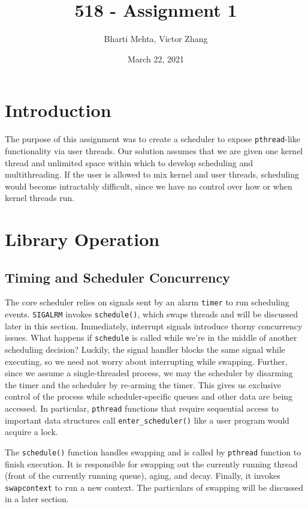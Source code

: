 \documentclass{article}
\title{518 - Assignment 1}
\author{Bharti Mehta, Victor Zhang}
\date{March 22, 2021}
\begin{document}
\maketitle

\section{Introduction}
The purpose of this assignment was to create a scheduler to expose \verb|pthread|-like functionality via user threads. Our solution assumes that we are given one kernel thread and unlimited space within which to develop scheduling and multithreading. If the user is allowed to mix kernel and user threads, scheduling would become intractably difficult, since we have no control over how or when kernel threads run.

\section{Library Operation}
\subsection{Timing and Scheduler Concurrency}
The core scheduler relies on signals sent by an alarm \verb|timer| to run scheduling events.
\verb|SIGALRM| invokes \verb|schedule()|, which swaps threads and will be discussed later in this section.
Immediately, interrupt signals introduce thorny concurrency issues.
What happens if \verb|schedule| is called while we're in the middle of another scheduling decision?
Luckily, the signal handler blocks the same signal while executing, so we need not worry about interrupting while swapping.
Further, since we assume a single-threaded process, we may  the scheduler by disarming the timer and  the scheduler by re-arming the timer.
This gives us exclusive control of the process while scheduler-specific queues and other data are being accessed.
In particular, \verb|pthread| functions that require sequential access to important data structures call \verb|enter_scheduler()| like a user program would acquire a lock.

The \verb|schedule()| function handles swapping and is called by \verb|pthread| function to finish execution.
It is responsible for swapping out the currently running thread (front of the currently running queue), aging, and decay.
Finally, it invokes \verb|swapcontext| to run a new context.
The particulars of swapping will be discussed in a later section.
\end{document}
